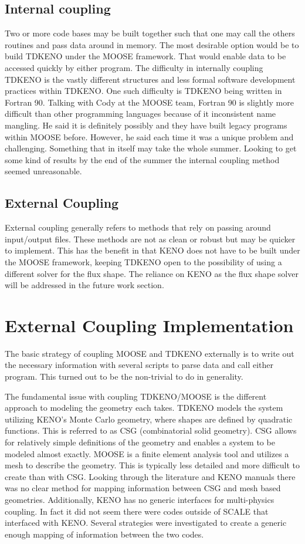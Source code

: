 \documentclass[11pt]{article}
\begin{document}
\subsection{Internal coupling}
 Two or more code bases may be built together such that one may call the others routines and pass data around in memory.  The most desirable option would be to build TDKENO under the MOOSE framework.  That would enable data to be accessed quickly by either program.  The difficulty in internally coupling TDKENO is the vastly different structures and less formal software development practices within TDKENO.  One such difficulty is TDKENO being written in Fortran 90.  Talking with Cody at the MOOSE team, Fortran 90 is slightly more difficult than other programming languages because of it inconsistent name mangling.  He said it is definitely possibly and they have built legacy programs within MOOSE before.  However, he said each time it was a unique problem and challenging.  Something that in itself may take the whole summer.  Looking to get some kind of results by the end of the summer the internal coupling method seemed unreasonable. 

\subsection{External Coupling}
External coupling generally refers to methods that rely on passing around input/output files.  These methods are not as clean or robust but may be quicker to implement. This has the benefit in that KENO does not have to be built under the MOOSE framework, keeping TDKENO open to the possibility of using a different solver for the flux shape.  The reliance on KENO as the flux shape solver will be addressed in the future work section. 

\section{External Coupling Implementation }

The basic strategy of coupling MOOSE and TDKENO externally is to write out the necessary information with several scripts to parse data and call either program. This turned out to be the non-trivial to do in generality. 

The fundamental issue with coupling TDKENO/MOOSE is the different approach to modeling the geometry each takes.  TDKENO models the system utilizing KENO's Monte Carlo geometry, where shapes are defined by quadratic functions. This is referred to as CSG (combinatorial solid geometry). CSG allows for relatively simple definitions of the geometry and enables a system to be modeled almost exactly. MOOSE is a finite element analysis tool and utilizes a mesh to describe the geometry.  This is typically less detailed and more difficult to create than with CSG.  Looking through the literature and KENO manuals there was no clear method for mapping information between CSG and mesh based geometries.  Additionally, KENO has no generic interfaces for multi-physics coupling.  In fact it did not seem there were codes outside of SCALE that interfaced with KENO.  Several strategies were investigated to create a generic enough mapping of information between the two codes. 
\end{document}
